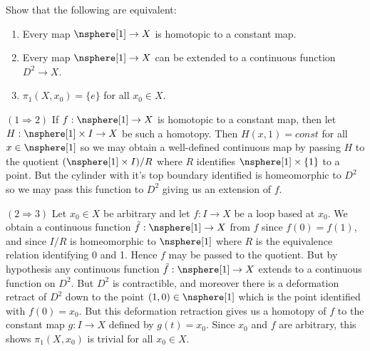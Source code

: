 \documentclass{book}                                                           %
\begin{document}
        \begin{problem}
            Show that the following are equivalent:
            \begin{enumerate}
                \item Every map $\nsphere[1]\rightarrow{X}$ is homotopic to a
                      constant map.
                \item Every map $\nsphere[1]\rightarrow{X}$ can be extended to a
                      continuous function $D^{2}\rightarrow{X}$.
                \item $\pi_{1}(X,x_{0})=\{e\}$ for all $x_{0}\in{X}$.
            \end{enumerate}
        \end{problem}
        \begin{solution}
            $(1\Rightarrow{2})$ If $f:\nsphere[1]\rightarrow{X}$ is homotopic to a
            constant map, then let $H:\nsphere[1]\times{I}\rightarrow{X}$ be such a
            homotopy. Then $H(x,1)=const$ for all $x\in\nsphere[1]$ so we may obtain
            a well-defined continuous map by passing $H$ to the quotient
            $(\nsphere[1]\times{I})/R$ where $R$ identifies $\nsphere[1]\times\{1\}$
            to a point. But the cylinder with it's top boundary identified is
            homeomorphic to $D^{2}$ so we may pass this function to $D^{2}$ giving
            us an extension of $f$.
            \par\hfill\par
            $(2\Rightarrow{3})$ Let $x_{0}\in{X}$ be arbitrary and let
            $f:I\rightarrow{X}$ be a loop based at $x_{0}$. We obtain a continuous
            function $\tilde{f}:\nsphere[1]\rightarrow{X}$ from $f$ since
            $f(0)=f(1)$, and since $I/R$ is homeomorphic to $\nsphere[1]$
            where $R$ is the equivalence relation identifying 0 and 1. Hence $f$ may
            be passed to the quotient. But by hypothesis any continuous function
            $\tilde{f}:\nsphere[1]\rightarrow{X}$ extends to a continuous function
            on $D^{2}$. But $D^{2}$ is contractible, and moreover there is a
            deformation retract of $D^{2}$ down to the point $(1,0)\in\nsphere[1]$
            which is the point identified with $f(0)=x_{0}$.
            But this deformation retraction gives us a homotopy of
            $f$ to the constant map $g:I\rightarrow{X}$ defined by $g(t)=x_{0}$.
            Since $x_{0}$ and $f$ are arbitrary, this shows $\pi_{1}(X,x_{0})$ is
            trivial for all $x_{0}\in{X}$.
            \par\hfill\par

\end{solution}
\end{document}
